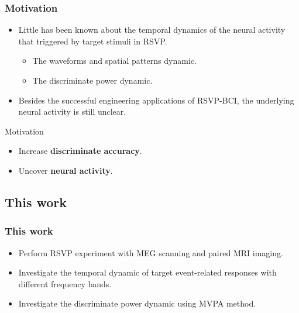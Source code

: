 \documentclass[aspectratio=169]{beamer}
\begin{document}
\begin{frame}
    \frametitle{Motivation}

    \begin{itemize}
        \item Little has been known about the temporal dynamics of the neural activity that triggered by target stimuli in RSVP.

              \begin{itemize}
                  \item The waveforms and spatial patterns dynamic.
                  \item The discriminate power dynamic.
              \end{itemize}

        \item Besides the successful engineering applications of RSVP-BCI, the underlying neural activity is still unclear.
    \end{itemize}

    \pause

    \begin{block}{Motivation}

        \begin{itemize}
            \item Increase \textbf{discriminate accuracy}.
            \item Uncover \textbf{neural activity}.
        \end{itemize}

    \end{block}

\end{frame}

\subsection{This work}

\begin{frame}
    \frametitle{This work}

    \begin{itemize}
        \item Perform RSVP experiment with MEG scanning and paired MRI imaging.
        \item Investigate the temporal dynamic of target event-related responses with different frequency bands.
        \item Investigate the discriminate power dynamic using MVPA method.
    \end{itemize}

\end{frame}
\end{document}

